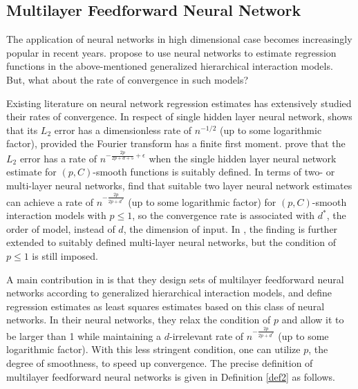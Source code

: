 \subsection{Multilayer Feedforward Neural Network}

The application of neural networks in high dimensional case becomes increasingly popular in recent years. \cite{Bauer2019} propose to use neural networks to estimate regression functions in the above-mentioned generalized hierarchical interaction models. But, what about the rate of convergence in such models?

Existing literature on neural network regression estimates has extensively studied their rates of convergence. In respect of single hidden layer neural network, \cite{Barron1994} shows that its $L_2$ error has a dimensionless rate of $n^{-1/2}$ (up to some logarithmic factor), provided the Fourier transform has a finite first moment. \cite{McCaffrey1994} prove that the $L_2$ error has a rate of $n^{-\frac{2p}{2p+d+5}+\epsilon}$ when the single hidden layer neural network estimate for $(p,C)$-smooth functions is suitably defined. In terms of two- or multi-layer neural networks, \cite{Kohler2005} find that suitable two layer neural network estimates can achieve a rate of $n^{-\frac{2p}{2p+d^*}}$ (up to some logarithmic factor) for $(p,C)$-smooth interaction models with $p \le 1$, so the convergence rate is associated with $d^*$, the order of model, instead of $d$, the dimension of input. In \cite{Kohler2017}, the finding is further extended to suitably defined multi-layer neural networks, but the condition of $p \le 1$ is still imposed.

A main contribution in \cite{Bauer2019} is that they design sets of multilayer feedforward neural networks according to generalized hierarchical interaction models, and define regression estimates as least squares estimates based on this class of neural networks. In their neural networks, they relax the condition of $p$ and allow it to be larger than 1 while maintaining a $d$-irrelevant rate of $n^{-\frac{2p}{2p+d^*}}$ (up to some logarithmic factor). With this less stringent condition, one can utilize $p$, the degree of smoothness, to speed up convergence. The precise definition of multilayer feedforward neural networks is given in Definition \ref{def2} as follows.


